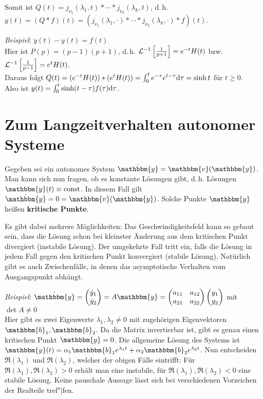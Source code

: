 Somit ist $Q(t) = j_{\nu_1}(\lambda_1, t) \ast \dotsm
\ast j_{\nu_k}(\lambda_k, t)$, d.\,h. \\
$y(t) = (Q \ast f)(t) =
(j_{\nu_1}(\lambda_1, \cdot) \ast \dotsb
\ast j_{\nu_k}(\lambda_k, \cdot) \ast f)(t)$.

\emph{Beispiel}:
$\ddot{y}(t) - y(t) = f(t)$ \\
Hier ist $P(p) = (p - 1)(p + 1)$,
d.\,h. $\mathcal{L}^{-1}\left[\frac{1}{p+1}\right] = e^{-t} H(t)$ bzw.
$\mathcal{L}^{-1}\left[\frac{1}{p-1}\right] = e^t H(t)$. \\
Daraus folgt $Q(t) = (e^{-t} H(t)) \ast (e^t H(t)) =
\int_0^t e^{-\tau} e^{t - \tau} \mathrm{d}\tau = \sinh t$ für $t \ge 0$. \\
Also ist $y(t) = \int_0^t \sinh(t - \tau) f(\tau) \mathrm{d}\tau$.

\section{%
    Zum Langzeitverhalten autonomer Systeme%
}

Gegeben sei ein autonomes System
$\dot{\mathbbm{y}} = \mathbbm{v}(\mathbbm{y})$.
Man kann sich nun fragen, ob es konstante Lösungen gibt, d.\,h.
Lösungen $\mathbbm{y}(t) \equiv \const$.
In diesem Fall gilt $\dot{\mathbbm{y}} = 0 = \mathbbm{v}(\mathbbm{y})$.
Solche Punkte $\mathbbm{y}$ heißen \textbf{kritische Punkte}.

Es gibt dabei mehrere Möglichkeiten:
Das Geschwindigkeitsfeld kann so gebaut sein, dass die Lösung schon bei
kleinster Änderung aus dem kritischen Punkt divergiert (instabile Lösung).
Der umgekehrte Fall tritt ein, falls die Lösung in jedem Fall gegen den
kritischen Punkt konvergiert (stabile Lösung).
Natürlich gibt es auch Zwischenfälle, in denen das asymptotische Verhalten
vom Ausgangspunkt abhängt.

\emph{Beispiel}:
$\dot{\mathbbm{y}} = \begin{pmatrix}\dot{y}_1 \\ \dot{y}_2\end{pmatrix} =
A\mathbbm{y} = \begin{pmatrix}a_{11} & a_{12} \\ a_{21} & a_{22}\end{pmatrix}
\begin{pmatrix}y_1 \\ y_2\end{pmatrix}$ mit $\det A \not= 0$ \\
Hier gibt es zwei Eigenwerte $\lambda_1, \lambda_2 \not= 0$ mit zugehörigen
Eigenvektoren $\mathbbm{b}_1, \mathbbm{b}_2$.
Da die Matrix invertierbar ist, gibt es genau einen kritischen Punkt
$\mathbbm{y} = 0$.
Die allgemeine Lösung des Systems ist
$\mathbbm{y}(t) = \alpha_1 \mathbbm{b}_1 e^{\lambda_1 t} +
\alpha_2 \mathbbm{b}_2 e^{\lambda_2 t}$.
Nun entscheiden $\Re(\lambda_1)$ und $\Re(\lambda_2)$, welcher der obigen
Fälle eintrifft:
Für $\Re(\lambda_1), \Re(\lambda_2) > 0$ erhält man eine instabile,
für $\Re(\lambda_1), \Re(\lambda_2) < 0$ eine stabile Lösung.
Keine pauschale Aussage lässt sich bei verschiedenen Vorzeichen der Realteile
tref"|fen.

